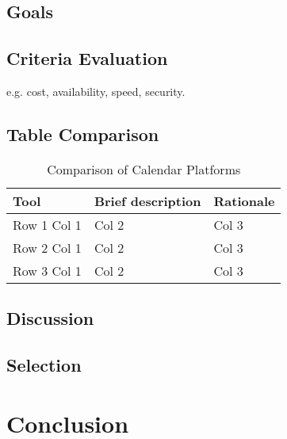 \documentclass[letterpaper,10pt,draftclsnofoot,onecolumn,titlepage]{IEEEtran}
\begin{document}
	\subsection{Goals}
	\subsection{Criteria Evaluation}
	e.g. cost, availability, speed, security.
	\subsection{Table Comparison}
	\begin{table}[ht]
	\caption{Comparison of Calendar Platforms}
	\begin{center}
	\begin{tabular} { | m{3cm} | m{5cm} | m{5cm} | }
	\hline\hline
	Tool & Brief description & Rationale \\ [0.5ex]
	\hline
	Row 1 Col 1 & Col 2 & Col 3 \\
	\hline
	Row 2 Col 1 & Col 2 & Col 3 \\
	\hline
	Row 3 Col 1 & Col 2 & Col 3 \\
	\hline
	\end{tabular}
	\end{center}
	\end{table}
	\subsection{Discussion}
	\subsection{Selection}
	\clearpage
	\section{Conclusion}

	
	
\end{document}
